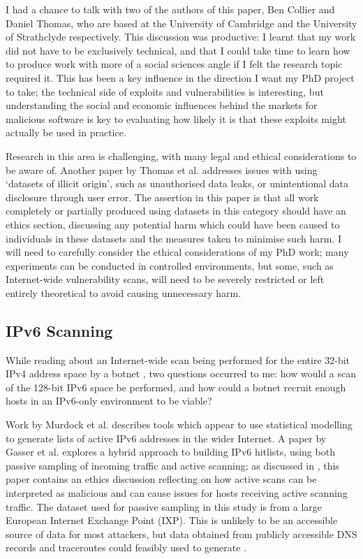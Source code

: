 \documentclass[10pt,sigconf]{acmart}
\begin{document}
I had a chance to talk with two of the authors of this paper, Ben Collier and Daniel Thomas, who are based at the University of Cambridge and the University of Strathclyde respectively.
This discussion was productive:
I learnt that my work did not have to be exclusively technical, and that I could take time to learn how to produce work with more of a social sciences angle if I felt the research topic required it.
This has been a key influence in the direction I want my PhD project to take;
the technical side of exploits and vulnerabilities is interesting, but understanding the social and economic influences behind the markets for malicious software is key to evaluating how likely it is that these exploits might actually be used in practice.

Research in this area is challenging, with many legal and ethical considerations to be aware of.
Another paper by Thomas et al. \cite{thomas2017} addresses issues with using `datasets of illicit origin', such as unauthorised data leaks, or unintentional data disclosure through user error.
The assertion in this paper is that all work completely or partially produced using datasets in this category should have an ethics section, discussing any potential harm which could have been caused to individuals in these datasets and the measures taken to minimise such harm.
I will need to carefully consider the ethical considerations of my PhD work;
many experiments can be conducted in controlled environments, but some, such as Internet-wide vulnerability scans, will need to be severely restricted or left entirely theoretical to avoid causing unnecessary harm.

\subsection{IPv6 Scanning}
\label{ipv6-reading}
While reading about an Internet-wide scan being performed for the entire 32-bit IPv4 address space by a botnet \cite{dainotte2013}, two questions occurred to me:
how would a scan of the 128-bit IPv6 space be performed, and how could a botnet recruit enough hosts in an IPv6-only environment to be viable?

Work by Murdock et al. \cite{murdock2017} describes tools which appear to use statistical modelling to generate lists of active IPv6 addresses in the wider Internet.
A paper by Gasser et al. \cite{gasser2016} explores a hybrid approach to building IPv6 hitlists, using both passive sampling of incoming traffic and active scanning;
as discussed in \cite{thomas2017}, this paper contains an ethics discussion reflecting on how active scans can be interpreted as malicious and can cause issues for hosts receiving active scanning traffic.
The dataset used for passive sampling in this study is from a large European Internet Exchange Point (IXP).
This is unlikely to be an accessible source of data for most attackers, but data obtained from publicly accessible DNS records and traceroutes could feasibly used to generate .
\end{document}
